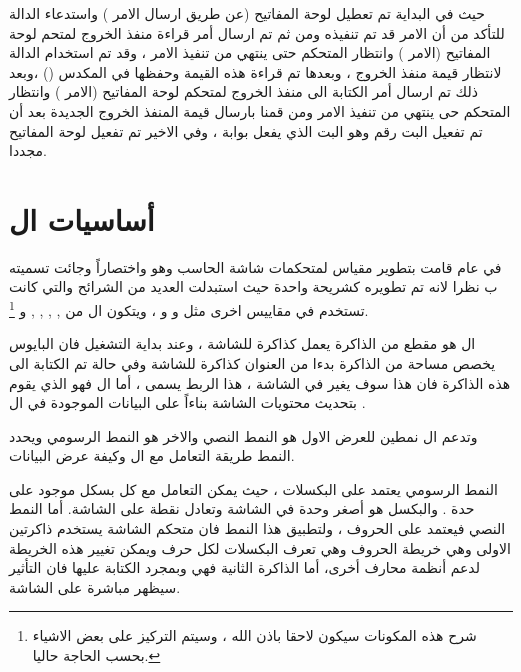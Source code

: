 \documentclass[document.tex]{subfiles}
\begin{document}
حيث في البداية تم تعطيل لوحة المفاتيح (عن طريق ارسال الامر ) واستدعاء الدالة  للتأكد من أن الامر قد تم تنفيذه ومن ثم تم ارسال أمر قراءة منفذ الخروج لمتحم لوحة المفاتيح (الامر ) وانتظار المتحكم حتى ينتهي من تنفيذ الامر ، وقد تم استخدام الدالة  لانتظار قيمة منفذ الخروج ، وبعدها تم قراءة هذه القيمة وحفظها في المكدس () ،وبعد ذلك تم ارسال أمر الكتابة الى منفذ الخروج لمتحكم لوحة المفاتيح (الامر ) وانتظار المتحكم حى ينتهي من تنفيذ الامر ومن قمنا بارسال قيمة المنفذ الخروج الجديدة بعد أن تم تفعيل البت رقم  وهو البت الذي يفعل بوابة  ، وفي الاخير تم تفعيل لوحة المفاتيح مجددا.
 

\section{أساسيات ال }
في عام  قامت  بتطوير مقياس لمتحكمات شاشة الحاسب وهو  واختصاراً  وجائت تسميته ب  نظرا لانه تم تطويره كشريحة واحدة  حيث استبدلت العديد من الشرائح والتي كانت تستخدم في مقاييس اخرى مثل  و  و  ، ويتكون ال  من ,  ,  ,  ,  و \footnote{شرح هذه المكونات سيكون لاحقا باذن الله ، وسيتم التركيز على بعض الاشياء بحسب الحاجة حاليا.}.

ال  هو مقطع من الذاكرة  يعمل كذاكرة للشاشة  ، وعند بداية التشغيل فان البايوس يخصص مساحة من الذاكرة بدءا من العنوان  كذاكرة للشاشة وفي حالة تم الكتابة الى هذه الذاكرة فان هذا سوف يغير في الشاشة ، هذا الربط يسمى ، أما ال  فهو الذي يقوم بتحديث محتويات الشاشة بناءاً على البيانات الموجودة في ال .
 
وتدعم ال  نمطين للعرض الاول هو النمط النصي  والاخر هو النمط الرسومي  ويحدد النمط طريقة التعامل مع ال  وكيفة عرض البيانات.

النمط الرسومي  يعتمد على البكسلات ، حيث يمكن التعامل مع كل بسكل موجود على حدة . والبكسل هو أصغر وحدة في الشاشة وتعادل نقطة على الشاشة. أما النمط النصي  فيعتمد على الحروف  ، ولتطبيق هذا النمط فان متحكم الشاشة  يستخدم ذاكرتين  الاولى وهي خريطة الحروف  وهي تعرف البكسلات لكل حرف ويمكن تغيير هذه الخريطة لدعم أنظمة محارف أخرى، أما الذاكرة الثانية فهي وبمجرد الكتابة عليها فان التأثير سيظهر مباشرة على الشاشة.
\end{document}
